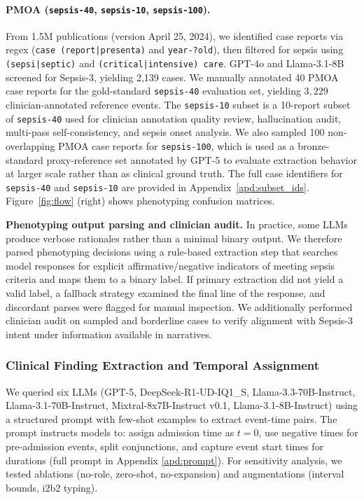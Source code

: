\documentclass[pmlr,twocolumn,10pt]{jmlr} %
\begin{document}
\paragraph{PMOA (\texttt{sepsis-40}, \texttt{sepsis-10}, \texttt{sepsis-100}).}
From 1.5M publications (version April 25, 2024), we identified case reports via regex (\texttt{case (report|presenta)} and \texttt{year-?old}), then filtered for sepsis using \texttt{(sepsi|septic)} and \texttt{(critical|intensive) care}.
GPT-4o and Llama-3.1-8B screened for Sepsis-3, yielding 2,139 cases.
We manually annotated 40 PMOA case reports for the gold-standard \texttt{sepsis-40} evaluation set, yielding $3,229$ clinician-annotated reference events.
The \texttt{sepsis-10} subset is a 10-report subset of \texttt{sepsis-40} used for clinician annotation quality review, hallucination audit, multi-pass self-consistency, and sepsis onset analysis.
We also sampled 100 non-overlapping PMOA case reports for \texttt{sepsis-100}, which is used as a bronze-standard proxy-reference set annotated by GPT-5 to evaluate extraction behavior at larger scale rather than as clinical ground truth.
The full case identifiers for \texttt{sepsis-40} and \texttt{sepsis-10} are provided in Appendix~\ref{apd:subset_ids}.
Figure~\ref{fig:flow} (right) shows phenotyping confusion matrices.

\textbf{Phenotyping output parsing and clinician audit.}
In practice, some LLMs produce verbose rationales rather than a minimal binary output. We therefore parsed phenotyping decisions using a rule-based extraction step that searches model responses for explicit affirmative/negative indicators of meeting sepsis criteria and maps them to a binary label. If primary extraction did not yield a valid label, a fallback strategy examined the final line of the response, and discordant parses were flagged for manual inspection. We additionally performed clinician audit on sampled and borderline cases to verify alignment with Sepsis-3 intent under information available in narratives.


\subsubsection{Clinical Finding Extraction and Temporal Assignment}
We queried six LLMs (GPT-5, DeepSeek-R1-UD-IQ1\_S, Llama-3.3-70B-Instruct, Llama-3.1-70B-Instruct, Mixtral-8x7B-Instruct v0.1, Llama-3.1-8B-Instruct) using a structured prompt with few-shot examples to extract event-time pairs. The prompt instructs models to: assign admission time as $t=0$, use negative times for pre-admission events, split conjunctions, and capture event start times for durations (full prompt in Appendix \ref{apd:prompt}). For sensitivity analysis, we tested ablations (no-role, zero-shot, no-expansion) and augmentations (interval bounds, i2b2 typing).
\end{document}
